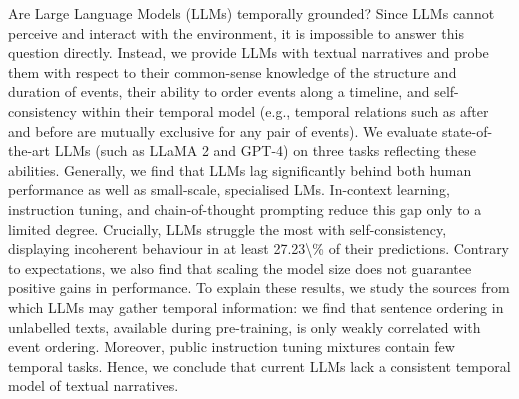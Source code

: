 Are Large Language Models (LLMs) temporally grounded? Since LLMs cannot perceive and interact with the environment, it is impossible to answer this question directly. Instead, we provide LLMs with textual narratives and probe them with respect to their common-sense knowledge of the structure and duration of events, their ability to order events along a timeline, and self-consistency within their temporal model (e.g., temporal relations such as after and before are mutually exclusive for any pair of events).  We evaluate state-of-the-art LLMs (such as LLaMA 2 and GPT-4) on three tasks reflecting these abilities. Generally, we find that LLMs lag significantly behind both human performance as well as small-scale, specialised LMs. In-context learning, instruction tuning, and chain-of-thought prompting reduce this gap only to a limited degree. Crucially, LLMs struggle the most with self-consistency, displaying incoherent behaviour in at least 27.23\textbackslash{}\% of their predictions. Contrary to expectations, we also find that scaling the model size does not guarantee positive gains in performance. To explain these results, we study the sources from which LLMs may gather temporal information: we find that sentence ordering in unlabelled texts, available during pre-training, is only weakly correlated with event ordering. Moreover, public instruction tuning mixtures contain few temporal tasks. Hence, we conclude that current LLMs lack a consistent temporal model of textual narratives.